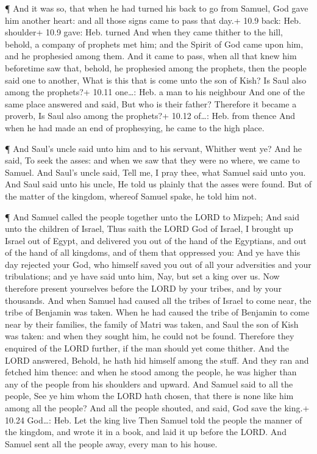  ¶ And it was so, that when he had turned his back to go
from Samuel, God gave him another heart: and all those signs came to
pass that day.+ 10.9 back: Heb. shoulder+ 10.9 gave: Heb. turned
 And when they came thither to the hill, behold, a company
of prophets met him; and the Spirit of God came upon him, and he
prophesied among them.  And it came to pass, when all that
knew him beforetime saw that, behold, he prophesied among the prophets,
then the people said one to another, What is this that is come unto the
son of Kish? Is Saul also among the prophets?+ 10.11 one\ldots: Heb. a
man to his neighbour  And one of the same place answered
and said, But who is their father? Therefore it became a proverb, Is
Saul also among the prophets?+ 10.12 of\ldots: Heb. from thence
 And when he had made an end of prophesying, he came to the
high place.

 ¶ And Saul's uncle said unto him and to his servant,
Whither went ye? And he said, To seek the asses: and when we saw that
they were no where, we came to Samuel.  And Saul's uncle
said, Tell me, I pray thee, what Samuel said unto you.  And
Saul said unto his uncle, He told us plainly that the asses were found.
But of the matter of the kingdom, whereof Samuel spake, he told him not.

 ¶ And Samuel called the people together unto the LORD to
Mizpeh;  And said unto the children of Israel, Thus saith
the LORD God of Israel, I brought up Israel out of Egypt, and delivered
you out of the hand of the Egyptians, and out of the hand of all
kingdoms, and of them that oppressed you:  And ye have this
day rejected your God, who himself saved you out of all your adversities
and your tribulations; and ye have said unto him, Nay, but set a king
over us. Now therefore present yourselves before the LORD by your
tribes, and by your thousands.  And when Samuel had caused
all the tribes of Israel to come near, the tribe of Benjamin was taken.
 When he had caused the tribe of Benjamin to come near by
their families, the family of Matri was taken, and Saul the son of Kish
was taken: and when they sought him, he could not be found.
 Therefore they enquired of the LORD further, if the man
should yet come thither. And the LORD answered, Behold, he hath hid
himself among the stuff.  And they ran and fetched him
thence: and when he stood among the people, he was higher than any of
the people from his shoulders and upward.  And Samuel said
to all the people, See ye him whom the LORD hath chosen, that there is
none like him among all the people? And all the people shouted, and
said, God save the king.+ 10.24 God\ldots: Heb. Let the king live
 Then Samuel told the people the manner of the kingdom, and
wrote it in a book, and laid it up before the LORD. And Samuel sent all
the people away, every man to his house.

